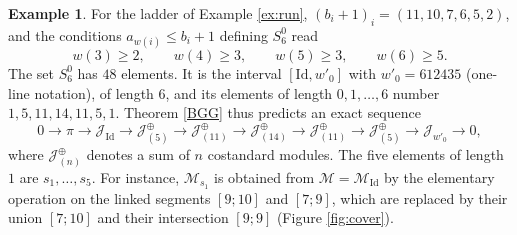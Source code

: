\documentclass[a4paper,12pt,leqno]{amsart}
\newcommand{\caJ}{\mathcal{J}}
\newcommand{\caM}{\mathcal{M}}
\theoremstyle{plain}
\theoremstyle{definition}
\theoremstyle{definition}
\newtheorem{example}[thm]{Example}
\newcommand{\Id}{\mathrm{Id}}
\begin{document}
\begin{example}\label{ex:run2} For the ladder of Example \ref{ex:run}, $(b_i+1)_i=(11,10,7,6,5,2)$,
and the conditions $a_{w(i)}\leq b_i+1$ defining $S_6^0$ read
\[w(3)\geq2,\qquad w(4)\geq3,\qquad w(5)\geq3,\qquad w(6)\geq5.\]
The set $S_6^0$ has $48$ elements. It is the interval $[\Id,w'_0]$ with $w'_0=612435$ (one-line
notation), of length $6$, and its elements of length $0,1,\ldots,6$ number $1,5,11,14,11,5,1$.
Theorem \ref{BGG} thus predicts an exact sequence
\[0\rightarrow\pi\rightarrow\caJ_{\Id}\rightarrow\caJ^{\oplus}_{(5)}\rightarrow\caJ^{\oplus}_{(11)}
\rightarrow\caJ^{\oplus}_{(14)}\rightarrow\caJ^{\oplus}_{(11)}\rightarrow\caJ^{\oplus}_{(5)}\rightarrow
\caJ_{w'_0}\rightarrow0,\]
where $\caJ^\oplus_{(n)}$ denotes a sum of $n$ costandard modules. The five elements of length $1$
are $s_1,\ldots,s_5$. For instance, $\caM_{s_1}$ is obtained from $\caM=\caM_{\Id}$ by the
elementary operation on the linked segments $[9;10]$ and $[7;9]$, which are replaced by their union
$[7;10]$ and their intersection $[9;9]$ (Figure \ref{fig:cover}).
\end{example}
\end{document}
